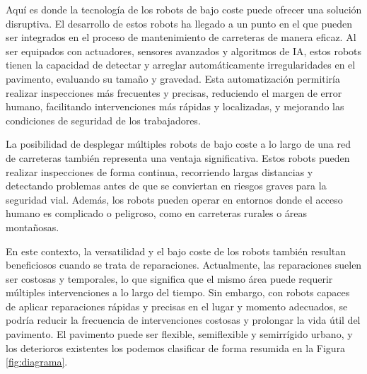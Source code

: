 Aquí es donde la tecnología de los robots de bajo coste puede ofrecer una solución disruptiva. El desarrollo de estos robots ha llegado a un punto en el que pueden ser integrados en el proceso de mantenimiento de carreteras de manera eficaz. Al ser equipados con actuadores, sensores avanzados y algoritmos de \ac{IA}, estos robots tienen la capacidad de detectar y arreglar automáticamente irregularidades en el pavimento, evaluando su tamaño y gravedad. Esta automatización permitiría realizar inspecciones más frecuentes y precisas, reduciendo el margen de error humano, facilitando intervenciones más rápidas y localizadas, y mejorando las condiciones de seguridad de los trabajadores.

La posibilidad de desplegar múltiples robots de bajo coste a lo largo de una red de carreteras también representa una ventaja significativa. Estos robots pueden realizar inspecciones de forma continua, recorriendo largas distancias y detectando problemas antes de que se conviertan en riesgos graves para la seguridad vial. Además, los robots pueden operar en entornos donde el acceso humano es complicado o peligroso, como en carreteras rurales o áreas montañosas.

En este contexto, la versatilidad y el bajo coste de los robots también resultan beneficiosos cuando se trata de reparaciones. Actualmente, las reparaciones suelen ser costosas y temporales, lo que significa que el mismo área puede requerir múltiples intervenciones a lo largo del tiempo. Sin embargo, con robots capaces de aplicar reparaciones rápidas y precisas en el lugar y momento adecuados, se podría reducir la frecuencia de intervenciones costosas y prolongar la vida útil del pavimento. El pavimento puede ser flexible, semiflexible y semirrígido urbano, y los deterioros existentes los podemos clasificar de forma resumida en la Figura \ref{fig:diagrama}.





